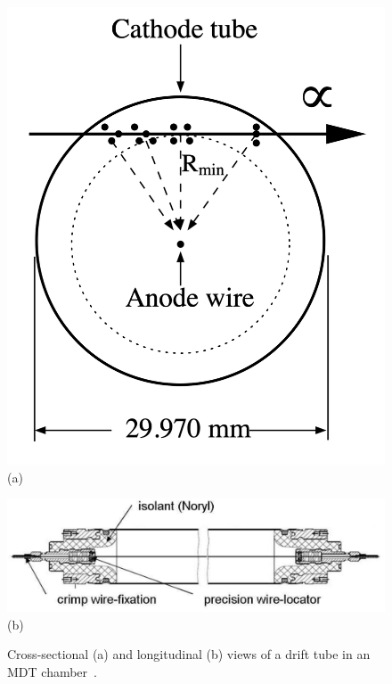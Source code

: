 \begin{figure}[htbp]
  \centering
  \begin{minipage}[c]{0.35\textwidth}
    \centering
    \includegraphics[width=\textwidth]{figs/chapter2/MDT_x_cut.png}
    \vspace{0.5em}
    (a)
  \end{minipage}
  \hfill
  \begin{minipage}[c]{0.6\textwidth}
    \centering
    \includegraphics[width=\textwidth]{figs/chapter2/MDT_y_cut.png}
    \vspace{0.5em}
    (b)
  \end{minipage}
  \caption{Cross-sectional (a) and longitudinal (b) views of a drift tube in an MDT chamber~\cite{ATLASDetector2008}.}
  \label{fig:MDT_tube}
\end{figure}

